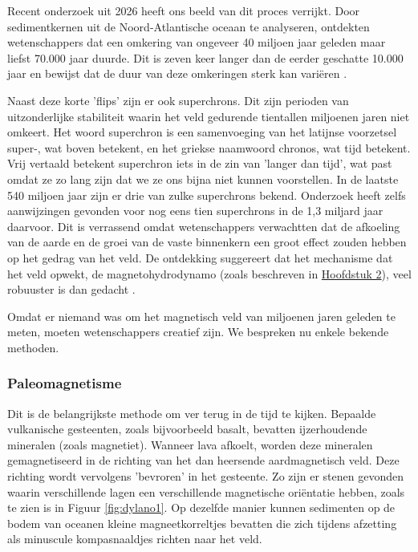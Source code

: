 \documentclass[12pt,a4paper]{article}
\begin{document}
Recent onderzoek uit 2026 heeft ons beeld van dit proces verrijkt. Door sedimentkernen uit de Noord-Atlantische oceaan te analyseren, ontdekten wetenschappers dat een omkering van ongeveer 40 miljoen jaar geleden maar liefst 70.000 jaar duurde.
Dit is zeven keer langer dan de eerder geschatte 10.000 jaar en bewijst dat de duur van deze omkeringen sterk kan variëren \cite{dylano_70.000}.

Naast deze korte 'flips' zijn er ook superchrons. Dit zijn perioden van uitzonderlijke stabiliteit waarin het veld gedurende tientallen miljoenen jaren niet omkeert. Het woord superchron is een samenvoeging van het latijnse voorzetsel super-, wat boven betekent, en het griekse naamwoord chronos, wat tijd betekent. Vrij vertaald betekent superchron iets in de zin van 'langer dan tijd', wat past omdat ze zo lang zijn dat we ze ons bijna niet kunnen voorstellen.
In de laatste 540 miljoen jaar zijn er drie van zulke superchrons bekend. Onderzoek heeft zelfs aanwijzingen gevonden voor nog eens tien superchrons in de 1,3 miljard jaar daarvoor.
Dit is verrassend omdat wetenschappers verwachtten dat de afkoeling van de aarde en de groei van de vaste binnenkern een groot effect zouden hebben op het gedrag van het veld.
De ontdekking suggereert dat het mechanisme dat het veld opwekt, de magnetohydrodynamo (zoals beschreven in \hyperref[sec:sec_2]{Hoofdstuk 2}), veel robuuster is dan gedacht \cite{dylano_superchron}.

Omdat er niemand was om het magnetisch veld van miljoenen jaren geleden te meten, moeten wetenschappers creatief zijn. We bespreken nu enkele bekende methoden.

\subsubsection*{Paleomagnetisme} Dit is de belangrijkste methode om ver terug in de tijd te kijken. Bepaalde vulkanische gesteenten, zoals bijvoorbeeld basalt, bevatten ijzerhoudende mineralen (zoals magnetiet).
Wanneer lava afkoelt, worden deze mineralen gemagnetiseerd in de richting van het dan heersende aardmagnetisch veld. Deze richting wordt vervolgens 'bevroren' in het gesteente. Zo zijn er stenen gevonden waarin verschillende lagen een verschillende magnetische oriëntatie hebben, zoals te zien is in Figuur \ref{fig:dylano1}.
Op dezelfde manier kunnen sedimenten op de bodem van oceanen kleine magneetkorreltjes bevatten die zich tijdens afzetting als minuscule kompasnaaldjes richten naar het veld.
\end{document}
